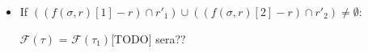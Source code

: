{\begin{definition}
\begin{itemize}
\begin{itemize}
             $\mathcal{F}(\tau) $ = a tree with root $(r'_1 - f(\sigma,\sigma)[1]) : (r'_2 - f(\sigma,\sigma)[2]):\sigma$  connected to the children $r'_1 :(f(\sigma,\sigma)[1]-\sigma)$  and $r'_2 :(f(\sigma,\sigma)[2]-\sigma)$, each having 
             $\mathcal{F}(\tau_1)$ and $\mathcal{F}(\tau_2)$, respectivelly, bellow them. 
             \item
             If $((f(\sigma,r)[1] - r)\cap r'_1)  \cup ((f(\sigma,r)[2] - r)\cap r'_2) \neq \emptyset $:
    
             
             $\mathcal{F}(\tau) $ = $\mathcal{F}(\tau_1) $[TODO] sera??
        \end{itemize}
    

    \end{itemize}
\end{definition}
}




